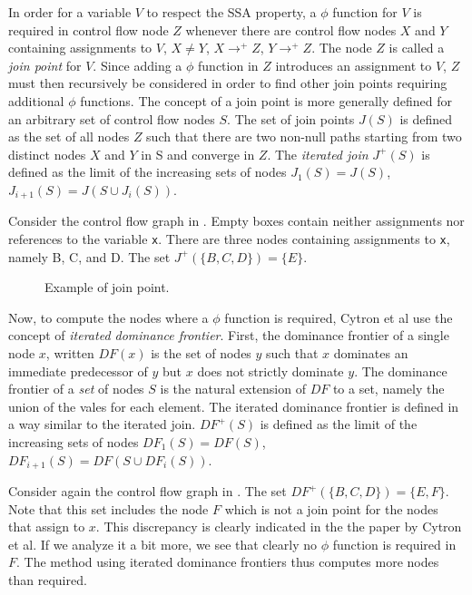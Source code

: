In order for a variable $V$ to respect the SSA property, a $\phi$
function for $V$ is required in control flow node $Z$ whenever there
are control flow nodes $X$ and $Y$ containing assignments to $V$, $X
\ne Y$, $X \rightarrow^+ Z$, $Y \rightarrow^+ Z$.  The node $Z$ is
called a \emph{join point} for $V$.  Since adding a $\phi$ function in
$Z$ introduces an assignment to $V$, $Z$ must then recursively be
considered in order to find other join points requiring additional
$\phi$ functions.  The concept of a join point is more generally
defined for an arbitrary set of control flow nodes $S$.  The set of
join points $J(S)$ is defined as the set of all nodes $Z$ such that
there are two non-null paths starting from two distinct nodes $X$ and
$Y$ in S and converge in $Z$.  The \emph{iterated join} $J^+(S)$ is
defined as the limit of the increasing sets of nodes $J_1(S) = J(S)$,
$J_{i+1}(S) = J(S \cup J_i(S))$.

Consider the control flow graph in .  Empty
boxes contain neither assignments nor references to the variable
\texttt{x}.  There are three nodes containing assignments to
\texttt{x}, namely B, C, and D.  The set $J^+(\{B, C, D\}) = \{E\}$.

\begin{figure}
\begin{center}
\end{center}
\caption{\label{fig-ssa-join-1}
Example of join point.}
\end{figure}

Now, to compute the nodes where a $\phi$ function is required, Cytron
et al use the concept of \emph{iterated dominance frontier}.  First,
the dominance frontier of a single node $x$, written $DF(x)$ is the
set of nodes $y$ such that $x$ dominates an immediate predecessor of
$y$ but $x$ does not strictly dominate $y$.  The dominance frontier of
a \emph{set} of nodes $S$ is the natural extension of $DF$ to a set,
namely the union of the vales for each element.  The iterated
dominance frontier is defined in a way similar to the iterated join. 
$DF^+(S)$ is defined as the limit of the
increasing sets of nodes $DF_1(S) = DF(S)$, $DF_{i+1}(S) = DF(S \cup
DF_i(S))$.

Consider again the control flow graph in .  The
set $DF^+(\{B, C, D\}) = \{E, F\}$.  Note that this set includes the
node $F$ which is not a join point for the nodes that assign to $x$.
This discrepancy is clearly indicated in the the paper by Cytron et
al.  If we analyze it a bit more, we see that clearly no $\phi$
function is required in $F$.  The method using iterated dominance
frontiers thus computes more nodes than required.  

